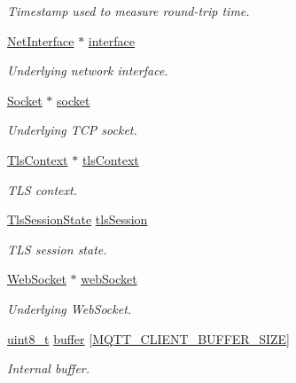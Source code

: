 \begin{DoxyCompactItemize}
\begin{DoxyCompactList}\small\item\em Timestamp used to measure round-\/trip time. \end{DoxyCompactList}\item 
\hyperlink{net_8h_a2234db8911a1148c9159979d8f5e0d6b}{Net\+Interface} $\ast$ \hyperlink{struct__MqttClientContext_a55be1361804af91b0d4572ce77d5d183}{interface}
\begin{DoxyCompactList}\small\item\em Underlying network interface. \end{DoxyCompactList}\item 
\hyperlink{socket_8h_aa85acfb0fa336ef495e6ba87fb88fc48}{Socket} $\ast$ \hyperlink{struct__MqttClientContext_ac49874b370be2e099097631107419cb4}{socket}
\begin{DoxyCompactList}\small\item\em Underlying T\+CP socket. \end{DoxyCompactList}\item 
\hyperlink{tls_8h_ac09f7a286c0cdf9b07ee1edd107946f5}{Tls\+Context} $\ast$ \hyperlink{struct__MqttClientContext_a608d4cfa1093feabf50d4b543d2c2184}{tls\+Context}
\begin{DoxyCompactList}\small\item\em T\+LS context. \end{DoxyCompactList}\item 
\hyperlink{structTlsSessionState}{Tls\+Session\+State} \hyperlink{struct__MqttClientContext_a03c2de5c5dff20ef248a91630cbe0e4b}{tls\+Session}
\begin{DoxyCompactList}\small\item\em T\+LS session state. \end{DoxyCompactList}\item 
\hyperlink{web__socket_8h_aad796fb4e3af91c4358c5b273d4a2028}{Web\+Socket} $\ast$ \hyperlink{struct__MqttClientContext_ab8b561bb1053fde3ea81d0b4802ca49e}{web\+Socket}
\begin{DoxyCompactList}\small\item\em Underlying Web\+Socket. \end{DoxyCompactList}\item 
\hyperlink{stdint_8h_aba7bc1797add20fe3efdf37ced1182c5}{uint8\+\_\+t} \hyperlink{struct__MqttClientContext_a36c316a35737e6160affa5c159cabf39}{buffer} \mbox{[}\hyperlink{mqtt__client_8h_a37c50db66771a2d524105033ca66ee7c}{M\+Q\+T\+T\+\_\+\+C\+L\+I\+E\+N\+T\+\_\+\+B\+U\+F\+F\+E\+R\+\_\+\+S\+I\+ZE}\mbox{]}
\begin{DoxyCompactList}\small\item\em Internal buffer. \end{DoxyCompactList}\item 

\end{DoxyCompactItemize}
